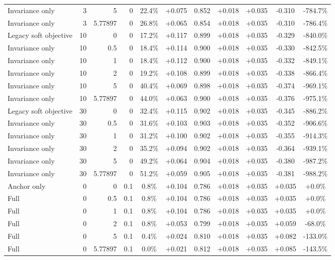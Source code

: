 \begin{table}[htbp]
\begin{tabular}{lrrrccccccc}
Invariance only & 3 & 5 & 0 & 22.4\% & +0.075 & 0.852 & +0.018 & +0.035 & -0.310 & -784.7\% \\
Invariance only & 3 & 5.77897 & 0 & 26.8\% & +0.065 & 0.854 & +0.018 & +0.035 & -0.310 & -786.4\% \\
Legacy soft objective & 10 & 0 & 0 & 17.2\% & +0.117 & 0.899 & +0.018 & +0.035 & -0.329 & -840.0\% \\
Invariance only & 10 & 0.5 & 0 & 18.4\% & +0.114 & 0.900 & +0.018 & +0.035 & -0.330 & -842.5\% \\
Invariance only & 10 & 1 & 0 & 18.4\% & +0.112 & 0.900 & +0.018 & +0.035 & -0.332 & -849.1\% \\
Invariance only & 10 & 2 & 0 & 19.2\% & +0.108 & 0.899 & +0.018 & +0.035 & -0.338 & -866.4\% \\
Invariance only & 10 & 5 & 0 & 40.4\% & +0.069 & 0.898 & +0.018 & +0.035 & -0.374 & -969.1\% \\
Invariance only & 10 & 5.77897 & 0 & 44.0\% & +0.063 & 0.900 & +0.018 & +0.035 & -0.376 & -975.1\% \\
Legacy soft objective & 30 & 0 & 0 & 32.4\% & +0.115 & 0.902 & +0.018 & +0.035 & -0.345 & -886.2\% \\
Invariance only & 30 & 0.5 & 0 & 31.6\% & +0.103 & 0.903 & +0.018 & +0.035 & -0.352 & -906.6\% \\
Invariance only & 30 & 1 & 0 & 31.2\% & +0.100 & 0.902 & +0.018 & +0.035 & -0.355 & -914.3\% \\
Invariance only & 30 & 2 & 0 & 35.2\% & +0.094 & 0.902 & +0.018 & +0.035 & -0.364 & -939.1\% \\
Invariance only & 30 & 5 & 0 & 49.2\% & +0.064 & 0.904 & +0.018 & +0.035 & -0.380 & -987.2\% \\
Invariance only & 30 & 5.77897 & 0 & 51.2\% & +0.059 & 0.905 & +0.018 & +0.035 & -0.381 & -988.2\% \\
Anchor only & 0 & 0 & 0.1 & 0.8\% & +0.104 & 0.786 & +0.018 & +0.035 & +0.035 & +0.0\% \\
Full & 0 & 0.5 & 0.1 & 0.8\% & +0.104 & 0.786 & +0.018 & +0.035 & +0.035 & +0.0\% \\
Full & 0 & 1 & 0.1 & 0.8\% & +0.104 & 0.786 & +0.018 & +0.035 & +0.035 & +0.0\% \\
Full & 0 & 2 & 0.1 & 0.8\% & +0.053 & 0.799 & +0.018 & +0.035 & +0.059 & -68.0\% \\
Full & 0 & 5 & 0.1 & 0.4\% & +0.024 & 0.810 & +0.018 & +0.035 & +0.082 & -133.0\% \\
Full & 0 & 5.77897 & 0.1 & 0.0\% & +0.021 & 0.812 & +0.018 & +0.035 & +0.085 & -143.5\% \\

\end{tabular}
\end{table}
